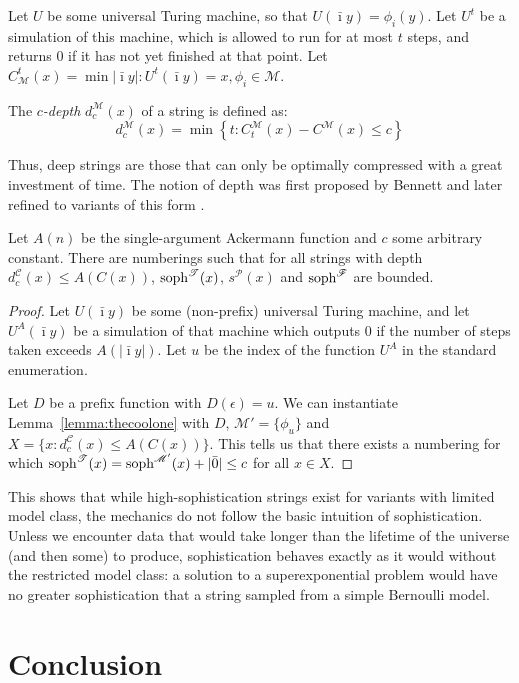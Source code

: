 \documentclass{style/llncs}
\newcommand{\M}{\mathscr M}
\newcommand{\C}{\mathscr C}
\newcommand{\T}{\mathscr T}
\newcommand{\F}{\mathscr F}
\renewcommand{\P}{\mathscr P}
\newcommand{\tn}[1]{\textnormal{#1}}
\newcommand{\s}{\tn{soph}}
\begin{document}
\begin{definition}[depth]
Let $U$ be some universal Turing machine, so that $U(\bar\imath y) = \phi_i(y)$. Let $U^t$ be a simulation of this machine, which is allowed to run for at most $t$ steps, and returns $0$ if it has not yet finished at that point. Let $C^t_\M(x) = \min{|\bar\imath y| : U^t(\bar\imath y) = x, \phi_i \in \M}$.

The \emph{$c$-depth} $d^\M_c(x)$ of a string is defined as:
\[
	d^\M_c(x) = \min \left\{t : C^\M_t(x) - C^\M(x) \leq c \right\}
\] 
\end{definition}

Thus, deep strings are those that can only be optimally compressed with a great investment of time. The notion of depth was first proposed by Bennett \cite{} and later refined to variants of this form \cite{}.

\begin{theorem}
Let $A(n)$ be the single-argument Ackermann function and $c$ some arbitrary constant. There are numberings such that for all strings with depth $d^\C_c(x) \leq A(C(x))$, $\s^\T(x)$, $s^\P(x)$ and $\s^\F$ are bounded.
\end{theorem}
\begin{proof}
Let $U(\bar\imath y)$ be some (non-prefix) universal Turing machine, and let $U^A(\bar\imath y)$ be a simulation of that machine which outputs $0$ if the number of steps taken exceeds $A(|\bar\imath y|)$. Let $u$ be the index of the function $U^A$ in the standard enumeration.

Let $D$ be a prefix function with $D(\epsilon) = u$. We can instantiate Lemma~\ref{lemma:thecoolone} with $D$, $\M' = \{\phi_u\}$ and $X = \{x : d^\C_c(x) \leq A(C(x))\}$. This tells us that there exists a numbering for which $\s^\T(x) = \s^{\M'}(x) + |\bar0| \leq c$ for all $x \in X$.
\end{proof}

This shows that while high-sophistication strings exist for variants with limited model class, the mechanics do not follow the basic intuition of sophistication. Unless we encounter data that would take longer than the lifetime of the universe (and then some) to produce, sophistication behaves exactly as it would without the restricted model class: a solution to a superexponential problem would have no greater sophistication that a string sampled from a simple Bernoulli model.

\section{Conclusion}
\end{document}
